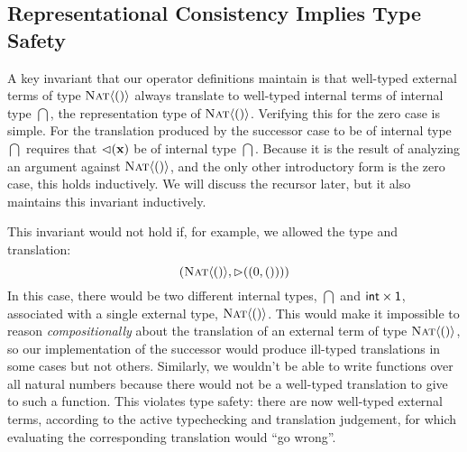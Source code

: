 \documentclass[10pt,preprint]{sigplanconf}
\begin{document}
{%

\subsection{Representational Consistency Implies Type Safety}\label{repcon}
A key invariant that our operator definitions maintain is that well-typed external terms of type $\textsc{Nat}\langle()\rangle$ always translate to well-typed internal terms of internal type $\dint$, the representation type of $\textsc{Nat}\langle()\rangle$. Verifying this for the zero case is simple. For the translation produced by the successor case to be of internal type $\dint$ requires that ${\lhd}({\textbf{x}})$ be of internal type $\dint$. Because it is the result of analyzing an argument against $\textsc{Nat}\langle()\rangle$, and the only other introductory form is the zero case, this holds inductively. We will discuss the recursor later, but it also maintains this invariant inductively.

This invariant would not hold if, for example, we allowed the type and translation: $$({{\textsc{Nat}\langle()\rangle,\rhd((0, ()))}})$$
\noindent
In this case, there would be two different internal types, $\dint$ and ${\sf int}\times\textsf{1}$,  associated with a single external type, $\textsc{Nat}\langle()\rangle$. This would make it impossible to reason \emph{compositionally} about the translation of an external term of type $\textsc{Nat}\langle()\rangle$, so our implementation of the successor would produce ill-typed translations in some cases but not others. Similarly, we wouldn't be able to write functions over all natural numbers because there would not be a well-typed translation to give to such a function. This violates type safety: there are now well-typed external terms, according to the active typechecking and translation judgement, for which evaluating the corresponding translation would ``go wrong''. 

}
\end{document}
